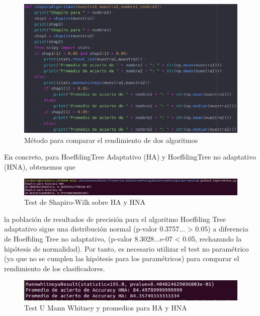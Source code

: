 \begin{figure}[H] %
	\centering
	\includegraphics[scale=0.45]{comparaAl.png}  %
	\caption{Método para comparar el rendimiento de dos algoritmos} 
	\label{fig:compAl}
\end{figure}

En concreto, para HoeffdingTree Adaptativo (HA) y HoeffdingTree no adaptativo (HNA), obtenemos que

\begin{figure}[H] %
	\centering
	\includegraphics[scale=0.35]{off1.png}  %
	\caption{Test de Shapiro-Wilk sobre HA y HNA} 
	\label{fig:off4}
\end{figure}
 
la población de resultados de precisión para el algoritmo Hoeffding Tree adaptativo sigue una distribución normal (p-valor 0.3757... > 0.05) a diferencia de Hoeffding Tree no adaptativo, (p-valor 8.3028...e-07 < 0.05, rechazando la hipótesis de normalidad). Por tanto, es necesario utilizar el test no paramétrico (ya que no se cumplen las hipótesis para los paramétricos) para comparar el rendimiento de los clasificadores. 

\begin{figure}[H] %
	\centering
	\includegraphics[scale=0.5]{off2.png}  %
	\caption{Test U Mann Whitney y promedios para HA y HNA} 
	\label{fig:off5}
\end{figure}


